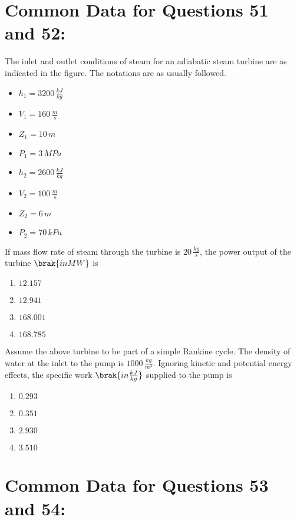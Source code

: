   \section{  Common Data for Questions 51 and 52:}
    
    The inlet and outlet conditions of steam for an adiabatic steam turbine are as indicated in the figure. The notations are as usually followed.
    
    \begin{itemize}
        \item $h_1 = 3200 \, \frac{kJ}{kg}$
        \item $V_1 = 160 \, \frac{m}{s}$
        \item $Z_1 = 10 \, m$
        \item $P_1 = 3 \, MPa$
        \item $h_2 = 2600 \, \frac{kJ}{kg}$
        \item $V_2 = 100 \, \frac{m}{s}$
        \item $Z_2 = 6 \, m$
        \item $P_2 = 70 \, kPa$
    \end{itemize}

    \item If mass flow rate of steam through the turbine is $20 \, \frac{kg}{s}$, the power output of the turbine $\brak{in 
 MW}$ is
    \begin{enumerate}
        \item $12.157$
        \item $12.941$
        \item $168.001$
        \item $168.785$
    \end{enumerate}

    \item Assume the above turbine to be part of a simple Rankine cycle. The density of water at the inlet to the pump is $1000 \, \frac{kg}{m^3}$. Ignoring kinetic and potential energy effects, the specific work $\brak{in \frac{kJ}{kg}}$ supplied to the pump is
    \begin{enumerate}
        \item $0.293$
        \item $0.351$
        \item $2.930$
        \item $3.510$
    \end{enumerate}

   \section{ Common Data for Questions 53 and 54:}
    
